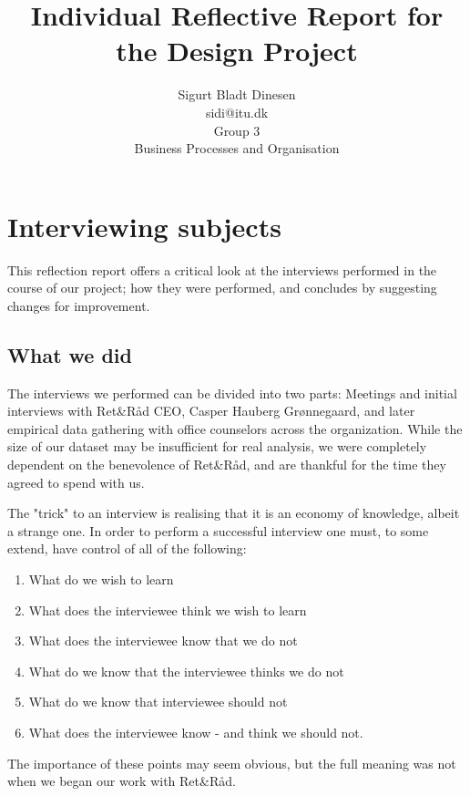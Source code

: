 \documentclass[a4paper, titlepage]{article}
\newcommand{\rr}{Ret\&Råd}
\begin{document}
\title{Individual Reflective Report for the Design Project}
\author{Sigurt Bladt Dinesen\\
sidi{@}itu.dk\\
Group 3\\
Business Processes and Organisation
}

\maketitle

\section*{Interviewing subjects}
This reflection report offers a critical look at the interviews performed in the
course of our project; how they were performed, and concludes by
suggesting changes for improvement.

\subsection*{What we did}
The interviews we performed can be divided into two parts: Meetings and initial
interviews with \rr{} CEO, Casper Hauberg Grønnegaard, and later empirical
data gathering with office counselors across the organization.
While the size of our dataset may be insufficient for real analysis, we were
completely dependent on the benevolence of \rr{}, and are thankful for the
time they agreed to spend with us.

The "trick" to an interview is realising that it is an economy of knowledge,
albeit a strange one. In order to perform a successful interview one must, to
some extend, have control of all of the following:
\begin{enumerate}
	\item \label{we wish} What do we wish to learn
	\item \label{think wish} What does the interviewee think we wish to learn
	\item \label{they know} What does the interviewee know that we do not
	\item What do we know that the interviewee thinks we do not
	\item What do we know that interviewee should not
	\item What does the interviewee know - and think we should not.
\end{enumerate}
The importance of these points may seem obvious, but the full meaning was not when
we began our work with \rr{}.
\end{document}
